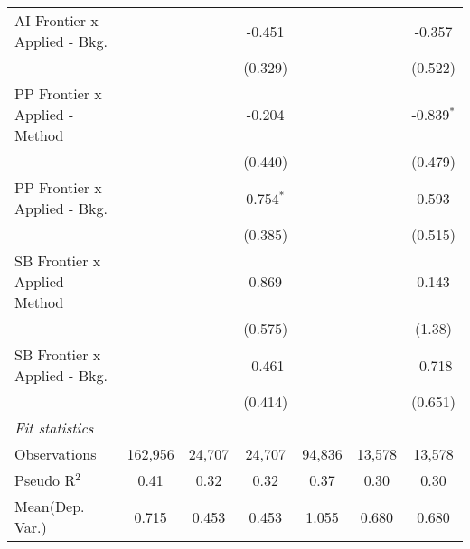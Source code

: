 \begin{tabular}{lcccccc}
   AI Frontier x Applied - Bkg.   &               &               & -0.451        &               &               & -0.357\\   
                                  &               &               & (0.329)       &               &               & (0.522)\\   
   PP Frontier x Applied - Method &               &               & -0.204        &               &               & -0.839$^{*}$\\   
                                  &               &               & (0.440)       &               &               & (0.479)\\   
   PP Frontier x Applied - Bkg.   &               &               & 0.754$^{*}$   &               &               & 0.593\\   
                                  &               &               & (0.385)       &               &               & (0.515)\\   
   SB Frontier x Applied - Method &               &               & 0.869         &               &               & 0.143\\   
                                  &               &               & (0.575)       &               &               & (1.38)\\   
   SB Frontier x Applied - Bkg.   &               &               & -0.461        &               &               & -0.718\\   
                                  &               &               & (0.414)       &               &               & (0.651)\\   
   \midrule
   \emph{Fit statistics}\\
   Observations                   & 162,956       & 24,707        & 24,707        & 94,836        & 13,578        & 13,578\\  
   Pseudo R$^2$                   & 0.41          & 0.32          & 0.32          & 0.37          & 0.30          & 0.30\\  
Mean(Dep. Var.) & 0.715 & 0.453 & 0.453 & 1.055 & 0.680 & 0.680 \\
   

\end{tabular}
